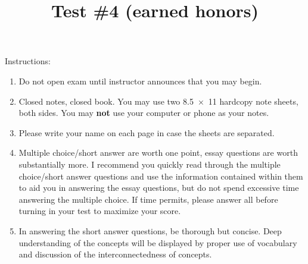 \documentclass[exam,addpoints,noanswers]{exam}
\title{Test \#4 (earned honors)}
\date{\printdate{6/1/2021}}
\author{\mobeardInstructorShort}
\begin{document}
\maketitle
\vfill
\mobeardExamNameBlock
\vfill
Instructions: 
\begin{enumerate}
\item Do not open exam until instructor announces that you may begin.
\item Closed notes, closed book.  You may use two \SI{8.5x11}{\inch} hardcopy note sheets, both sides. You may \textbf{not} use your computer or phone as your notes. 
\item Please write your name on each page in case the sheets are separated. 
\item Multiple choice/short answer are worth one point, essay questions are worth substantially more. I recommend you quickly read through the multiple choice/short answer questions and use the information contained within them to aid you in answering the essay questions, but do not spend excessive time answering the multiple choice. If time permits, please answer all before turning in your test to maximize your score.
\item In answering the short answer questions, be thorough but concise. Deep understanding of the concepts will be displayed by proper use of vocabulary and discussion of the interconnectedness of concepts.
\end{enumerate}
\vfill
\begin{center}
\gradetable[h][questions]
\end{center}
\clearpage
\end{document}
